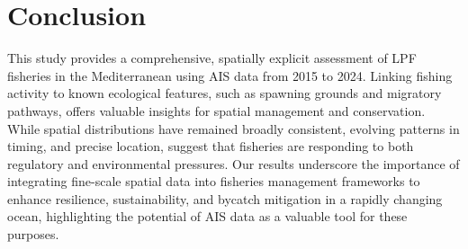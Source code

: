 \chapter{Conclusion}

This study provides a comprehensive, spatially explicit assessment of LPF fisheries in the
Mediterranean using AIS data from 2015 to 2024. Linking fishing activity to known ecological
features, such as spawning grounds and migratory pathways, offers valuable insights for spatial
management and conservation. While spatial distributions have remained broadly consistent, evolving
patterns in timing, and precise location, suggest that fisheries are responding to both regulatory
and environmental pressures. Our results underscore the importance of integrating fine-scale
spatial data into fisheries management frameworks to enhance resilience, sustainability, and
bycatch mitigation in a rapidly changing ocean, highlighting the potential of AIS data as a
valuable tool for these purposes.